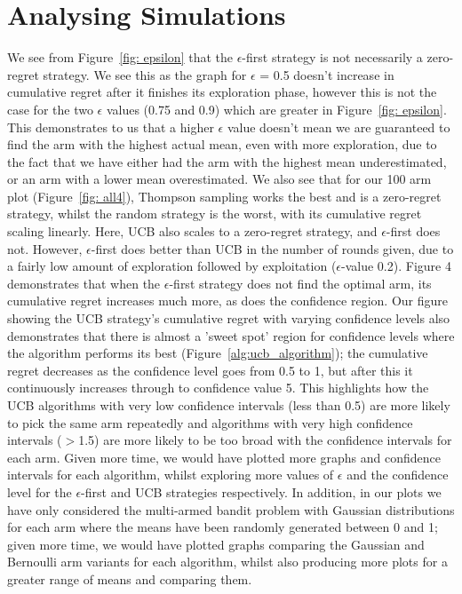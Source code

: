 \section{Analysing Simulations}\label{sec:analysing-simulations}
We see from Figure~\ref{fig: epsilon} that the $\epsilon$-first strategy is not necessarily a zero-regret strategy.
We see this as the graph for $\epsilon$ = 0.5 doesn't increase in cumulative regret after it finishes its exploration phase, however this is not the case for the two $\epsilon$ values (0.75 and 0.9) which are greater in Figure~\ref{fig: epsilon}.
This demonstrates to us that a higher $\epsilon$ value doesn't mean we are guaranteed to find the arm with the highest actual mean, even with more exploration, due to the fact that we have either had the arm with the highest mean underestimated, or an arm with a lower mean overestimated.
\newline
We also see that for our 100 arm plot (Figure~\ref{fig: all4}), Thompson sampling works the best and is a zero-regret strategy, whilst the random strategy is the worst, with its cumulative regret scaling linearly.
Here, UCB also scales to a zero-regret strategy, and $\epsilon$-first does not.
However, $\epsilon$-first does better than UCB in the number of rounds given, due to a fairly low amount of exploration followed by exploitation ($\epsilon$-value 0.2).
\newline
Figure 4 demonstrates that when the $\epsilon$-first strategy does not find the optimal arm, its cumulative regret increases much more, as does the confidence region.
\newline
Our figure showing the UCB strategy's cumulative regret with varying confidence levels also demonstrates that there is almost a 'sweet spot' region for confidence levels where the algorithm performs its best (Figure~\ref{alg:ucb_algorithm});
the cumulative regret decreases as the confidence level goes from 0.5 to 1, but after this it continuously increases through to confidence value 5.
This highlights how the UCB algorithms with very low confidence intervals (less than 0.5) are more likely to pick the same arm repeatedly and algorithms with very high confidence intervals ($>$1.5) are more likely to be too broad with the confidence intervals for each arm.
\newline
Given more time, we would have plotted more graphs and confidence intervals for each algorithm, whilst exploring more values of $\epsilon$ and the confidence level for the $\epsilon$-first and UCB strategies respectively.
In addition, in our plots we have only considered the multi-armed bandit problem with Gaussian distributions for each arm where the means have been randomly generated between 0 and 1;
given more time, we would have plotted graphs comparing the Gaussian and Bernoulli arm variants for each algorithm, whilst also producing more plots for a greater range of means and comparing them.